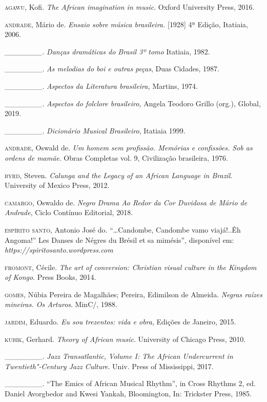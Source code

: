 \begin{Parskip}
\textsc{agawu}, Kofi. \emph{The African imagination in music}. Oxford University
Press, 2016.

\textsc{andrade}, Mário de. \emph{Ensaio sobre música brasileira.} {[}1928{]} 4ª
Edição, Itatiaia, 2006.

\emph{\_\_\_\_\_\_\_. Danças dramáticas do Brasil 3º tomo} Itatiaia,
1982.

\_\_\_\_\_\_\_. \emph{As melodias do boi e outras peças}, Duas Cidades,
1987.

\_\_\_\_\_\_\_. \emph{Aspectos da Literatura brasileira,} Martins, 1974.

\_\_\_\_\_\_\_. \emph{Aspectos do folclore brasileiro,} Angela Teodoro
Grillo (org.), Global, 2019.

\_\_\_\_\_\_\_. \emph{Dicionário Musical Brasileiro}, Itatiaia 1999.

\textsc{andrade}, Oswald de. \emph{Um homem sem profissão. Memórias e confissões.
Sob as ordens de mamãe}. Obras Completas vol. 9, Civilização brasileira,
1976.

\textsc{byrd}, Steven. \emph{Calunga and the Legacy of an African Language in
Brazil}. University of Mexico Press, 2012.

\textsc{camargo}, Oswaldo de. \emph{Negro Drama Ao Redor da Cor Duvidosa de Mário
de Andrade}, Ciclo Contínuo Editorial, 2018.

\textsc{espírito santo}, Antonio José do. ``\ldots{}Candombe, Candombe vamo
viajá!..Êh Angoma!'' Les Danses de Négres du Brésil et sa mimésis'',
disponível em: \emph{https://spiritosanto.wordpress.com}

\textsc{fromont}, Cécile. \emph{The art of conversion: Christian visual culture
in the Kingdom of Kongo}.  Press Books, 2014.

\textsc{gomes}, Núbia Pereira de Magalhães; Pereira, Edimilson de Almeida.
\emph{Negras raízes mineiras. Os Arturos}. MinC/, 1988.

\textsc{jardim}, Eduardo. \emph{Eu sou trezentos: vida e obra}, Edições de
Janeiro, 2015.

\textsc{kubik}, Gerhard. \emph{Theory of African music}. University of Chicago
Press, 2010.

\_\_\_\_\_\_\_. \emph{Jazz Transatlantic, Volume I: The African
Undercurrent in Twentieth"-Century Jazz Culture}. Univ. Press of
Mississippi, 2017.

\_\_\_\_\_\_\_. ``The Emics of African Musical Rhythm'', in Cross
Rhythms 2, ed. Daniel Avorgbedor and Kwesi Yankah, Bloomington, In:
Trickster Press, 1985.


\end{Parskip}

